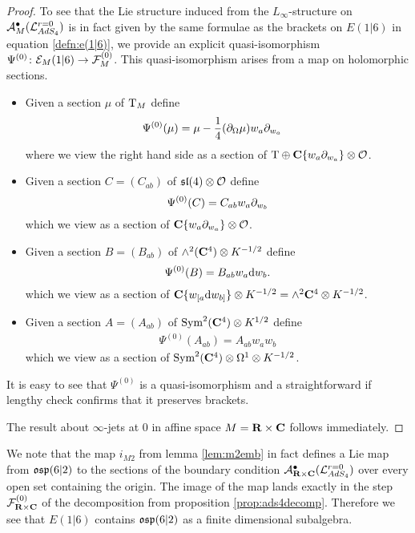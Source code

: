 \documentclass[../main.tex]{subfiles}
\begin{document}
\begin{proof}
To see that the Lie structure induced from the $L_\infty$-structure on $\mathcal A_M^\bullet (\mathcal{L}^{r=0}_{AdS_4} )$ is in fact given by the same formulae as the brackets on $E(1|6)$ in equation \ref{defn:e(1|6)}, we provide an explicit quasi-isomorphism $\Psi^{(0)} \colon \mathcal{E}_M(1|6) \to \mathcal{F}^{(0)}_{M}$.
This quasi-isomorphism arises from a map on holomorphic sections.

\begin{itemize}
\item Given a section $\mu$ of ${\mathrm{T}}_M$ define
\begin{align*}
\Psi^{(0)} (\mu) &= \mu - \frac 14 (\partial_\Omega \mu) w_a\partial_{w_a} 
\end{align*}
where we view the right hand side as a section of ${\mathrm{T}} \oplus \mathbf{C}\{w_a \partial_{w_a}\} \otimes \mathcal O$.
\item Given a section $C = (C_{ab})$ of $\mathfrak{sl}(4)\otimes \mathcal{O}$ define
\[
\Psi^{(0)} (C) = C_{ab}w_a\partial_{w_b}
\]
which we view as a section of $\mathbf{C}\{w_a \partial_{w_a}\} \otimes \mathcal O$.
\item Given a section $B = (B_{ab})$ of $\wedge^2 (\mathbf{C}^4) \otimes K^{-1/2}$ define
\[
\Psi^{(0)} (B) = B_{ab} w_a \mathrm{d} w_b .
\]
which we view as a section of $\mathbf{C}\{w_{[a} \mathrm{d} w_{b]}\} \otimes K^{-1/2} = \wedge^2 \mathbf{C}^4 \otimes K^{-1/2}$.
\item Given a section 
$A=(A_{ab})$ of $\text{Sym}^2 (\mathbf{C}^4) \otimes K^{1/2}$ define
\begin{align*}
\Psi^{(0)} (A_{ab}) = A_{ab} w_a w_b 
\end{align*}
which we view as a section of $\text{Sym}^2 (\mathbf{C}^4) \otimes \Omega^1 \otimes K^{-1/2}$.
\end{itemize}
It is easy to see that $\Psi^{(0)}$ is a quasi-isomorphism and a straightforward if lengthy check confirms that it preserves brackets. 

The result about $\infty$-jets at $0$ in affine space $M = \mathbf{R} \times \mathbf{C}$ follows immediately.
\end{proof}

\begin{rmk}
We note that the map $i_{M2}$ from lemma \ref{lem:m2emb} in fact defines a Lie map from $\mathfrak{osp}(6|2)$ to the sections of the boundary condition $\mathcal A_{\mathbf{R} \times \mathbf{C}}^\bullet (\mathcal{L}^{r=0}_{AdS_4} )$ over every open set containing the origin. 
The image of the map lands exactly in the step $\mathcal{F}^{(0)}_{\mathbf{R}\times \mathbf{C}}$ of the decomposition from proposition \ref{prop:ads4decomp}. 
Therefore we see that $E(1|6)$ contains $\mathfrak{osp}(6|2)$ as a finite dimensional subalgebra.  
\end{rmk}
\end{document}
